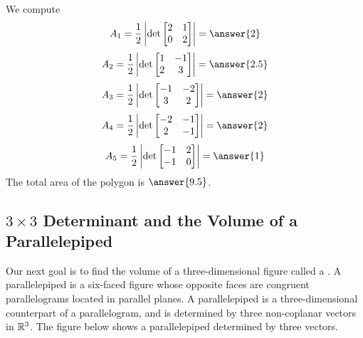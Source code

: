 \documentclass{ximera}
\begin{document}
\begin{example}
\begin{explanation}
We compute
$$A_1=\frac{1}{2}\left|\det\begin{bmatrix}2 & 1\\0 & 2\end{bmatrix}\right |=\answer{2}$$
$$A_2=\frac{1}{2}\left|\det\begin{bmatrix}1 & -1\\2 & 3\end{bmatrix}\right |=\answer{2.5}$$
$$A_3=\frac{1}{2}\left|\det\begin{bmatrix}-1 & -2\\3 & 2\end{bmatrix}\right |=\answer{2}$$
$$A_4=\frac{1}{2}\left|\det\begin{bmatrix}-2 & -1\\2 & -1\end{bmatrix}\right |=\answer{2}$$
$$A_5=\frac{1}{2}\left|\det\begin{bmatrix}-1 & 2\\-1 & 0\end{bmatrix}\right |=\answer{1}$$
The total area of the polygon is $\answer{9.5}$.
\end{explanation}
\end{example}


\subsection*{$3\times 3$ Determinant and the Volume of a Parallelepiped}

Our next goal is to find the volume of a three-dimensional figure called a .  A parallelepiped is a six-faced figure whose opposite faces are congruent parallelograms located in parallel planes.  A parallelepiped is a three-dimensional counterpart of a parallelogram, and is determined by three non-coplanar vectors in $\mathbb{R}^3$.  The figure below shows a parallelepiped determined by three vectors.

\begin{center}
\end{center}
\end{document}
